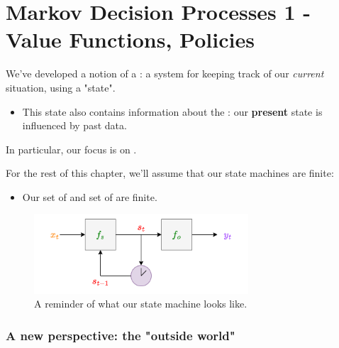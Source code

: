 \setcounter{chapter}{12-1} %

\chapter{Markov Decision Processes 1 - Value Functions, Policies}

\setcounter{section}{0}

    We've developed a notion of a : a system for keeping track of our \textit{current} situation, using a "state".

    \begin{itemize}
        \item This state also contains information about the : our \textbf{present} state is influenced by past data.
    \end{itemize}

    In particular, our focus is on . \\

    \begin{clarification}
        For the rest of this chapter, we'll assume that our state machines are finite:

        \begin{itemize}
            \item Our set of  and set of  are finite.
        \end{itemize}
    \end{clarification}

    \begin{figure}[H]
        \centering
        \includegraphics[width=80mm,scale=0.5]{images/rnn_images/state_machine_diagram.png}
        
        \caption*{A reminder of what our state machine looks like.}
    \end{figure}
    


    \phantom{}

    \subsection{A new perspective: the "outside world"}

